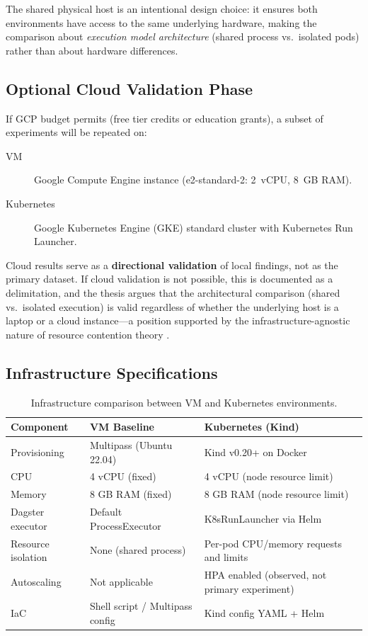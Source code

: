 The shared physical host is an intentional design choice: it ensures both environments have access to the same underlying hardware, making the comparison about \emph{execution model architecture} (shared process vs.\ isolated pods) rather than about hardware differences.

\subsection{Optional Cloud Validation Phase}
\label{subsec:cloud-validation}

If GCP budget permits (free tier credits or education grants), a subset of experiments will be repeated on:

\begin{description}
  \item[VM] Google Compute Engine instance (e2-standard-2: 2~vCPU, 8~GB RAM).
  \item[Kubernetes] Google Kubernetes Engine (GKE) standard cluster with Kubernetes Run Launcher.
\end{description}

Cloud results serve as a \textbf{directional validation} of local findings, not as the primary dataset. If cloud validation is not possible, this is documented as a delimitation, and the thesis argues that the architectural comparison (shared vs.\ isolated execution) is valid regardless of whether the underlying host is a laptop or a cloud instance---a position supported by the infrastructure-agnostic nature of resource contention theory \citep{nanda1991}.

\subsection{Infrastructure Specifications}
\label{subsec:infra-specs}

\begin{table}[H]
  \centering
  \caption{Infrastructure comparison between VM and Kubernetes environments.}
  \label{tab:infra-specs}
  \small
  \begin{tabularx}{\textwidth}{lXX}
    \toprule
    \textbf{Component} & \textbf{VM Baseline} & \textbf{Kubernetes (Kind)} \\
    \midrule
    Provisioning        & Multipass (Ubuntu 22.04)       & Kind v0.20+ on Docker \\
    CPU                 & 4 vCPU (fixed)                 & 4 vCPU (node resource limit) \\
    Memory              & 8 GB RAM (fixed)               & 8 GB RAM (node resource limit) \\
    Dagster executor    & Default ProcessExecutor        & K8sRunLauncher via Helm \\
    Resource isolation  & None (shared process)          & Per-pod CPU/memory requests and limits \\
    Autoscaling         & Not applicable                 & HPA enabled (observed, not primary experiment) \\
    IaC                 & Shell script / Multipass config & Kind config YAML + Helm \\
    \bottomrule
  \end{tabularx}
\end{table}
